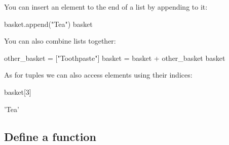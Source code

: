 \begin{raw}
\end{raw}





You can insert an element to the end of a list by appending to it:




\begin{pyin}
basket.append("Tea")
basket
\end{pyin}





\begin{raw}
\end{raw}





You can also combine lists together:




\begin{pyin}
other_basket = ["Toothpaste"]
basket = basket + other_basket
basket
\end{pyin}





\begin{pyin}
\end{pyin}





As for tuples we can also access elements using their indices:




\begin{pyin}
basket[3]
\end{pyin}





\begin{pyin}
'Tea'
\end{pyin}





\subsection{Define a function}
\label{\detokenize{tools-for-mathematics/06-probability/how/main:define-a-function}}\label{\detokenize{tools-for-mathematics/06-probability/how/main:id2}}

